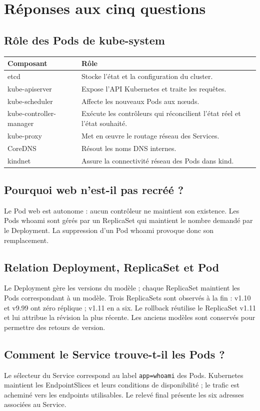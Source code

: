 \documentclass[11pt,a4paper]{article}
\begin{document}
\clearpage\section{Réponses aux cinq questions}
\subsection{Rôle des Pods de kube-system}
\begin{tabularx}{\linewidth}{lX}\toprule
\textbf{Composant} & \textbf{Rôle} \\\midrule
etcd & Stocke l'état et la configuration du cluster. \\
kube-apiserver & Expose l'API Kubernetes et traite les requêtes. \\
kube-scheduler & Affecte les nouveaux Pods aux nœuds. \\
kube-controller-manager & Exécute les contrôleurs qui réconcilient l'état réel et l'état souhaité. \\
kube-proxy & Met en œuvre le routage réseau des Services. \\
CoreDNS & Résout les noms DNS internes. \\
kindnet & Assure la connectivité réseau des Pods dans kind. \\\bottomrule
\end{tabularx}
\subsection{Pourquoi web n'est-il pas recréé ?}
Le Pod web est autonome : aucun contrôleur ne maintient son existence. Les Pods whoami sont gérés par un ReplicaSet qui maintient le nombre demandé par le Deployment. La suppression d'un Pod whoami provoque donc son remplacement.
\subsection{Relation Deployment, ReplicaSet et Pod}
Le Deployment gère les versions du modèle ; chaque ReplicaSet maintient les Pods correspondant à un modèle. Trois ReplicaSets sont observés à la fin : v1.10 et v9.99 ont zéro réplique ; v1.11 en a six. Le rollback réutilise le ReplicaSet v1.11 et lui attribue la révision la plus récente. Les anciens modèles sont conservés pour permettre des retours de version.
\subsection{Comment le Service trouve-t-il les Pods ?}
Le sélecteur du Service correspond au label \texttt{app=whoami} des Pods. Kubernetes maintient les EndpointSlices et leurs conditions de disponibilité ; le trafic est acheminé vers les endpoints utilisables. Le relevé final présente les six adresses associées au Service.
\end{document}

